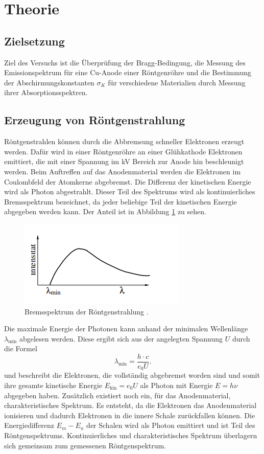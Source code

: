 \section{Theorie}
\label{sec:Theorie}
\subsection{Zielsetzung}
Ziel des Versuchs ist die Überprüfung der Bragg-Bedingung, die Messung des Emissionspektrum für eine Cu-Anode
einer Röntgenröhre und die Bestimmung der Abschirmungskonstanten $\sigma_K$ für verschiedene Materialien durch Messung ihrer Absorptionsspektren.
\subsection{Erzeugung von Röntgenstrahlung}
Röntgenstrahlen können durch die Abbremsung schneller Elektronen erzeugt werden. Dafür wird in einer Röntgenröhre an einer
Glühkathode Elektronen emittiert, die mit einer Spannung im kV Bereich zur Anode hin beschleunigt werden. Beim Auftreffen auf das Anodenmaterial werden 
die Elektronen im Coulombfeld der Atomkerne abgebremst. Die Differenz der kinetischen Energie wird als Photon abgestrahlt. Dieser Teil des Spektrums wird als kontinuierliches 
Bremsspektrum bezeichnet, da jeder beliebige Teil der kinetischen Energie abgegeben werden kann. Der Anteil ist in Abbildung \ref{fig:Brems} zu sehen.
\begin{figure}[H]
    \centering
    \includegraphics[scale=1.5]{content/Bremsspektrum.png}
    \caption{Bremsspektrum der Röntgenstrahlung \cite{sample}.}
    \label{fig:Brems}
\end{figure}
\noindent Die maximale Energie der Photonen kann anhand der minimalen Wellenlänge $\lambda_\text{min}$ abgelesen werden. Diese ergibt sich aus der angelegten Spannung $U$
durch die Formel
\begin{equation}
    \lambda_\text{min}=\frac{h\cdot c}{e_0U}.
    \label{eq:minWelle}
\end{equation}
und beschreibt die Elektronen, die vollständig abgebremst worden sind und somit ihre gesamte kinetische Energie $E_\text{kin}=e_0U$ als Photon mit Energie $E=h\nu$ abgegeben haben.
Zusätzlich existiert noch ein, für das Anodenmaterial, charakteristisches Spektrum. Es entsteht, da die Elektronen das Anodenmaterial ionisieren und dadurch
Elektronen in die innere Schale zurückfallen können. Die Energiedifferenz $E_m-E_n$ der Schalen wird als Photon emittiert und ist Teil des Röntgenspektrums.
Kontinuierliches und charakteristisches Spektrum überlagern sich gemeinsam zum gemessenen Röntgenspektrum.
